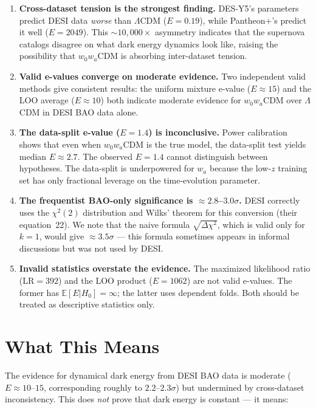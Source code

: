\documentclass[11pt,a4paper]{article}
\newcommand{\E}{\mathbb{E}}
\newcommand{\LCDM}{$\Lambda$CDM}
\begin{document}
\begin{enumerate}
    \item \textbf{Cross-dataset tension is the strongest finding.} DES-Y5's parameters predict DESI data \textit{worse} than \LCDM{} ($E = 0.19$), while Pantheon+'s predict it well ($E = 2049$). This ${\sim}10{,}000\times$ asymmetry indicates that the supernova catalogs disagree on what dark energy dynamics look like, raising the possibility that $w_0w_a$CDM is absorbing inter-dataset tension.

    \item \textbf{Valid e-values converge on moderate evidence.} Two independent valid methods give consistent results: the uniform mixture e-value ($E \approx 15$) and the LOO average ($E \approx 10$) both indicate moderate evidence for $w_0w_a$CDM over \LCDM{} in DESI BAO data alone.

    \item \textbf{The data-split e-value ($E = 1.4$) is inconclusive.} Power calibration shows that even when $w_0w_a$CDM is the true model, the data-split test yields median $E \approx 2.7$. The observed $E = 1.4$ cannot distinguish between hypotheses. The data-split is underpowered for $w_a$ because the low-$z$ training set has only fractional leverage on the time-evolution parameter.

    \item \textbf{The frequentist BAO-only significance is $\approx 2.8$--$3.0\sigma$.} DESI correctly uses the $\chi^2(2)$ distribution and Wilks' theorem for this conversion (their equation~22). We note that the naive formula $\sqrt{\Delta\chi^2}$, which is valid only for $k=1$, would give $\approx 3.5\sigma$ --- this formula sometimes appears in informal discussions but was not used by DESI.

    \item \textbf{Invalid statistics overstate the evidence.} The maximized likelihood ratio ($\text{LR} = 392$) and the LOO product ($E = 1062$) are not valid e-values. The former has $\E[E|H_0] = \infty$; the latter uses dependent folds. Both should be treated as descriptive statistics only.
\end{enumerate}

\section{What This Means}

The evidence for dynamical dark energy from DESI BAO data is moderate ($E \approx 10$--$15$, corresponding roughly to $2.2$--$2.3\sigma$) but undermined by cross-dataset inconsistency. This does \textit{not} prove that dark energy is constant --- it means:
\end{document}
